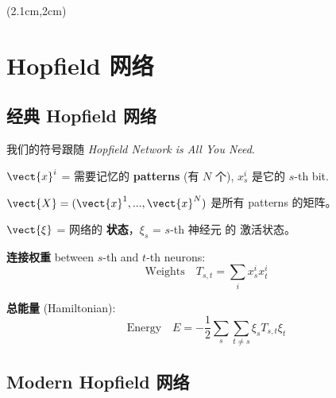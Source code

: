 \begin{preview}
\begin{minipage}{\textwidth}
\setlength{\parskip}{0.4\baselineskip}

\begin{textblock*}{20cm}(2.1cm,2cm) %
	{}
	\hspace{8cm}
\end{textblock*}
\vspace*{0.3cm} 

\section{Hopfield 网络}

\subsection{经典 Hopfield 网络}

我们的符号跟随 \textit{Hopfield Network is All You Need}.

$\vect{x}^i$ = 需要记忆的 \textbf{patterns} (有 $N$ 个), $x^i_{s}$ 是它的 $s$-th bit.

$\vect{X} = (\vect{x}^1, ... , \vect{x}^N)$ 是所有 patterns 的矩阵。

$\vect{\xi}$ = 网络的 \textbf{状态}，$\xi_s$ = $s$-th 神经元 的 激活状态。

\textbf{连接权重} between $s$-th and $t$-th neurons:
\begin{equation}
\boxed{\mbox{Weights}} \quad T_{s,t} = \sum_i x^i_s x^i_t
\end{equation}

\textbf{总能量} (Hamiltonian):
\begin{equation}
\boxed{\mbox{Energy}} \quad E = -\frac{1}{2} \sum_s \sum_{t \neq s} \xi_s T_{s,t} \xi_t
\end{equation}

\subsection{Modern Hopfield 网络}


\end{minipage}
\end{preview}
